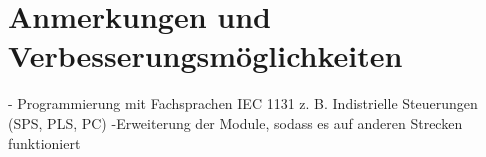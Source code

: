 \chapter{Anmerkungen und Verbesserungsmöglichkeiten}

- Programmierung mit Fachsprachen IEC 1131 z. B. Indistrielle Steuerungen (SPS, PLS, PC)
-Erweiterung der Module, sodass es auf anderen Strecken funktioniert

